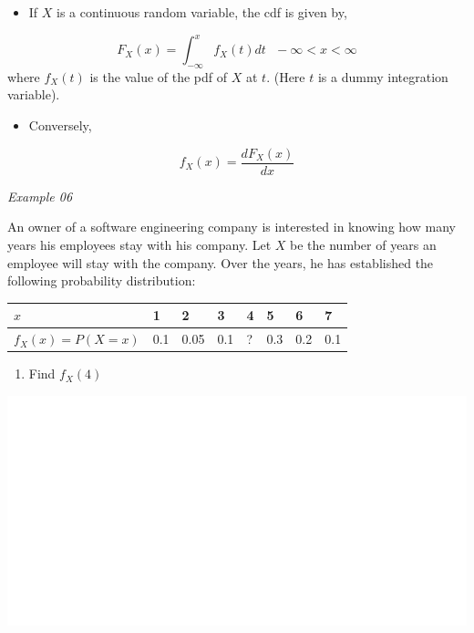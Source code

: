 \documentclass[]{book}
\providecommand{\tightlist}{%
  \setlength{\itemsep}{0pt}\setlength{\parskip}{0pt}}
\begin{document}
\begin{itemize}
\tightlist
\item
  If \(X\) is a continuous random variable, the cdf is given by,
\end{itemize}

\[F_X(x) = \int_{-\infty}^{x}f_X(t)dt \text{  } -\infty <x<\infty\]
where \(f_X(t)\) is the value of the pdf of \(X\) at \(t\). (Here \(t\) is a dummy integration variable).

\begin{itemize}
\tightlist
\item
  Conversely,
\end{itemize}

\[f_X(x)= \frac{dF_X(x)}{dx}\]

\emph{Example 06}

An owner of a software engineering company is interested in knowing how many years his employees stay with his company. Let \(X\) be the number of years an employee will stay with the company. Over the years, he has established the following probability distribution:

\newpage

\begin{longtable}[]{@{}llllllll@{}}
\toprule
\(x\) & 1 & 2 & 3 & 4 & 5 & 6 & 7\tabularnewline
\midrule
\endhead
\(f_X(x) = P(X=x)\) & 0.1 & 0.05 & 0.1 & ? & 0.3 & 0.2 & 0.1\tabularnewline
\bottomrule
\end{longtable}

\begin{enumerate}
\def\labelenumi{\arabic{enumi}.}
\tightlist
\item
  Find \(f_X(4)\)
\end{enumerate}

\begin{center}\includegraphics[width=1\linewidth]{figure/Ch1box8-1} \end{center}
\end{document}
